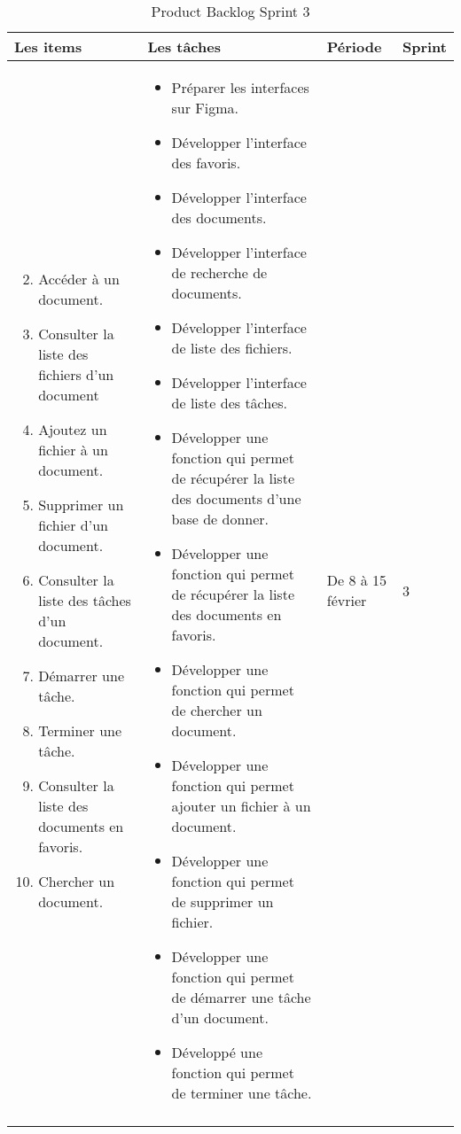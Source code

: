 \begin{longtable}{|p{4cm}|p{7cm}|p{2cm}|p{2cm}|}
  \hline
  \textbf{Les items} &\textbf{Les tâches} & \textbf{Période} & \textbf{Sprint} \\
  \hline
  \vspace{-\baselineskip}
  \begin{enumerate}
    \setcounter{enumi}{1}
    \itemsep0em 
      \item Accéder à un document.
      \item Consulter la liste des fichiers d'un document
      \item Ajoutez un fichier à un document.
      \item Supprimer un fichier d'un document.
      \item Consulter la liste des tâches d'un document.
      \item Démarrer une tâche.
      \item Terminer une tâche.
      \item Consulter la liste des documents en favoris.
      \item Chercher un document.
      

  \end{enumerate}
  &
  \vspace{-\baselineskip}
  \begin{itemize}
    \itemsep0em 
    \item Préparer les interfaces sur Figma.
    \item Développer l'interface des favoris.
    \item Développer l'interface des documents.
    \item Développer l'interface de recherche de documents.
    \item Développer l'interface de liste des fichiers.
    \item Développer l'interface de liste des tâches.
    \item Développer une fonction qui permet de récupérer la liste des documents d'une base de donner.
    \item Développer une fonction qui permet de récupérer la liste des documents en favoris.
    \item Développer une fonction qui permet de chercher un document.
    \item Développer une fonction qui permet ajouter un fichier à un document.
    \item Développer une fonction qui permet de supprimer un fichier.
    \item Développer une fonction qui permet de démarrer une tâche d'un document.
    \item Développé une fonction qui permet de terminer une tâche.

  \end{itemize}
  &
  De 8 à 15 février  
  &
  3
  \\
  \hline
  \caption{Product Backlog Sprint 3}
  \label{tab:product_backlog_sprint_3}



\end{longtable}



